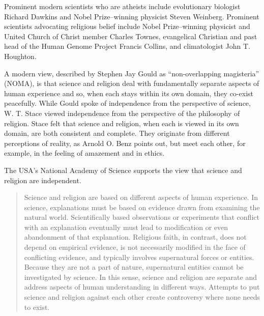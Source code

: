 Prominent modern scientists who are atheists include evolutionary biologist Richard Dawkins and Nobel Prize--winning physicist Steven Weinberg. Prominent scientists advocating religious belief include Nobel Prize--winning physicist and United Church of Christ member Charles Townes, evangelical Christian and past head of the Human Genome Project Francis Collins, and climatologist John T. Houghton.

A modern view, described by Stephen Jay Gould as ``non-overlapping magisteria'' (NOMA), is that science and religion deal with fundamentally separate aspects of human experience and so, when each stays within its own domain, they co-exist peacefully. While Gould spoke of independence from the perspective of science, W. T. Stace viewed independence from the perspective of the philosophy of religion. Stace felt that science and religion, when each is viewed in its own domain, are both consistent and complete. They originate from different perceptions of reality, as Arnold O. Benz points out, but meet each other, for example, in the feeling of amazement and in ethics.

The USA's National Academy of Science supports the view that science and religion are independent.

\begin{quote}
Science and religion are based on different aspects of human experience. In science, explanations must be based on evidence drawn from examining the natural world. Scientifically based observations or experiments that conflict with an explanation eventually must lead to modification or even abandonment of that explanation. Religious faith, in contrast, does not depend on empirical evidence, is not necessarily modified in the face of conflicting evidence, and typically involves supernatural forces or entities. Because they are not a part of nature, supernatural entities cannot be investigated by science. In this sense, science and religion are separate and address aspects of human understanding in different ways. Attempts to put science and religion against each other create controversy where none needs to exist.
\end{quote}


